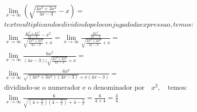 \begin{ex}
\begin{align}
&\lim_{x\rightarrow \infty} \left(\sqrt{\frac{4x^3+3x^2}{4x-3}}-x\right)=\nonumber\\
&text{multiplicando e dividindo pelo conjugado da expressao, temos:}\nonumber\\
&\lim_{x\rightarrow \infty} \frac{\frac{4x^3+3x^2}{4x-3}-x^2}{\sqrt{\frac{4x^3+3x^2}{4x-3}}+x}=\lim_{x\rightarrow \infty} \frac{\frac{6x^2}{4x-3}}{\sqrt{\frac{4x^3+3x^2}{4x-3}}+x}=\nonumber\\
&\lim_{x\rightarrow \infty} \frac{6x^2}{(4x-3)(\sqrt{\frac{4x^3+3x^2}{4x-3}}+x}=\nonumber\\
&\lim_{x\rightarrow \infty} \frac{6x^2}{\sqrt{(4x^3+3x^2)(4x-3)}+x(4x-3)}=\nonumber\\
&\text{dividindo-se o numerador e o denominador por} \quad x^2,\quad \text{temos:}\nonumber\\
&\lim_{x\rightarrow \infty} \frac{6}{\sqrt{(4+\frac{3}{x})(4-\frac{3}{x})}+4-\frac{3}{x}}=\frac{6}{4+4}=\frac{3}{4}\nonumber
\end{align}
\end{ex}